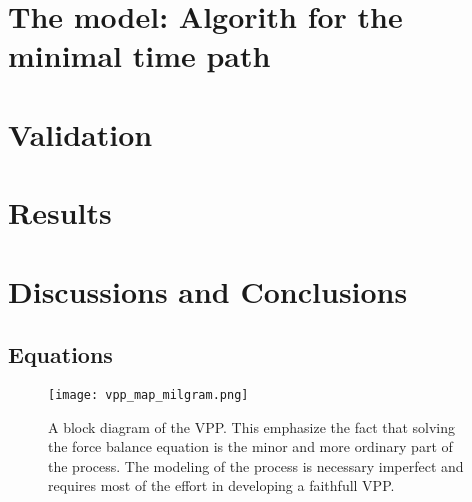 \section{The model: Algorith for the minimal time path}
\section{Validation}
\section{Results}
\section{Discussions and Conclusions}
\appendix
\subsection{Equations } \label{forces_equations} %
\begin{figure}
\centering
  \texttt{[image: vpp\_map\_milgram.png]}
 \caption{A block diagram of the VPP. This emphasize the fact that solving the force balance equation is the minor and more ordinary part of the process. The modeling of the process is necessary imperfect and requires most of the effort in developing a faithfull VPP. \cite{milgram1998fluid} }
\label{vpp_diagram}
\end{figure}
\newpage